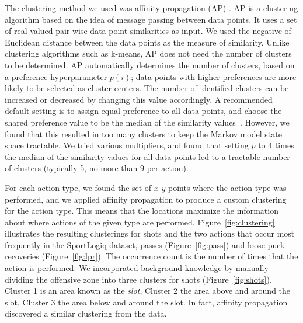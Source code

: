 The clustering method we used was affinity propagation (AP) \citep{frey2007clustering}. AP is a clustering algorithm based on the idea of message passing between data points. It uses a set of real-valued pair-wise data point similarities as input.
  We used the negative of Euclidean distance between the data points as the measure of similarity. Unlike clustering algorithms such as k-means, AP does not need the number of clusters to be determined. AP automatically determines the number of clusters,
based on a preference hyperparameter $p(i)$; data points with higher preferences are more likely to be selected as cluster centers. The number of identified clusters can be increased or decreased by changing this value accordingly. A recommended default setting is to assign equal preference to all data points, and choose the shared preference value to be the median of the similarity values~\citep{frey2007clustering}. However, we found that this resulted in too many clusters to keep the Markov model state space tractable. We tried various multipliers, and found that setting $p$ to $4$ times the median of the similarity values for all data points led to a tractable number of clusters (typically 5, no more than 9 per action). 

For each action type, we found the set of $x$-$y$ points where the action type was performed, and we applied affinity propagation to produce a  custom clustering for the action type. This means that the locations maximize the information about where actions of the given type are performed.
Figure~\ref{fig:clustering} illustrates the resulting clusterings for shots and the two actions that occur most frequently in the SportLogiq dataset, passes (Figure~\ref{fig:pass}) and loose puck recoveries (Figure~\ref{fig:lpr}). The occurrence count is the number of times that the action is performed. We incorporated background knowledge by manually dividing the offensive zone into three clusters for shots (Figure~\ref{fig:shots}). Cluster 1 is an area known as the {\em slot}, Cluster 2 the area above and around the slot, Cluster 3 the area below and around the slot. In fact, affinity propagation discovered a similar clustering from the data.

